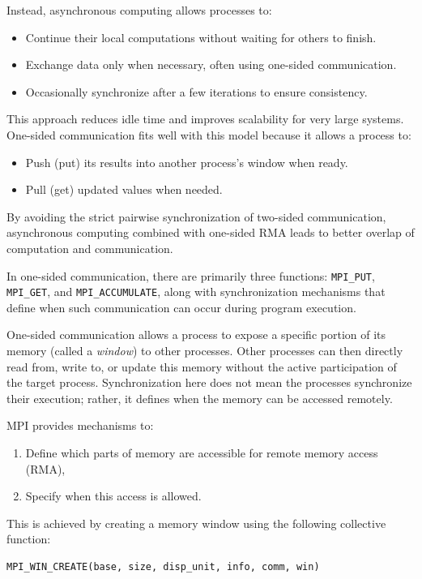 \documentclass[12pt]{book}
\begin{document}
Instead, asynchronous computing allows processes to:
\begin{itemize}
    \item Continue their local computations without waiting for others to finish.
    \item Exchange data only when necessary, often using one-sided communication.
    \item Occasionally synchronize after a few iterations to ensure consistency.
\end{itemize}

This approach reduces idle time and improves scalability for very large systems. One-sided communication fits well with this model because it allows a process to:
\begin{itemize}
    \item Push (put) its results into another process's window when ready.
    \item Pull (get) updated values when needed.
\end{itemize}

By avoiding the strict pairwise synchronization of two-sided communication, asynchronous computing combined with one-sided RMA leads to better overlap of computation and communication.


In one-sided communication, there are primarily three functions: \texttt{MPI\_PUT}, \texttt{MPI\_GET}, and \texttt{MPI\_ACCUMULATE}, along with synchronization mechanisms that define when such communication can occur during program execution. 

One-sided communication allows a process to expose a specific portion of its memory (called a \emph{window}) to other processes. Other processes can then directly read from, write to, or update this memory without the active participation of the target process. Synchronization here does not mean the processes synchronize their execution; rather, it defines when the memory can be accessed remotely.

MPI provides mechanisms to:
\begin{enumerate}
    \item Define which parts of memory are accessible for remote memory access (RMA),
    \item Specify when this access is allowed.
\end{enumerate}

This is achieved by creating a memory window using the following collective function:
\begin{lstlisting}[style=cppstyle]
MPI_WIN_CREATE(base, size, disp_unit, info, comm, win)
\end{lstlisting}
\end{document}
